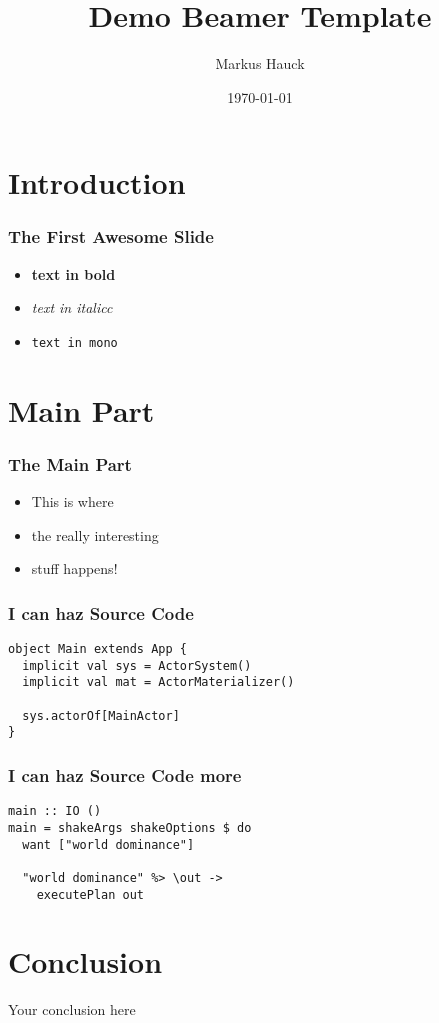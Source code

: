 \documentclass{beamer}
\title{Demo Beamer Template}
\author{Markus Hauck}
\date{\today}
\begin{document}
 
\frame{\titlepage}

\section{Introduction}
\label{sec:introduction}
 
\begin{frame}
\frametitle{The First Awesome Slide}
\begin{itemize}
\item \textbf{text in bold}
\item \textit{text in italicc}
\item \texttt{text in mono}
\end{itemize}
\end{frame}

\section{Main Part}
\label{sec:main-part}
\begin{frame}
  \frametitle{The Main Part}
  \begin{itemize}
  \item This is where
  \item the really interesting
  \item stuff happens!
  \end{itemize}
\end{frame}

\begin{frame}[fragile]
  \frametitle{I can haz Source Code}
  \begin{center}
\begin{verbatim}
object Main extends App {
  implicit val sys = ActorSystem()
  implicit val mat = ActorMaterializer()
  
  sys.actorOf[MainActor]
}
\end{verbatim}
  \end{center}
\end{frame}

\begin{frame}[fragile]
  \frametitle{I can haz Source Code more}
  \begin{center}
\begin{verbatim}
main :: IO ()
main = shakeArgs shakeOptions $ do
  want ["world dominance"]

  "world dominance" %> \out ->
    executePlan out
\end{verbatim}
  \end{center}
\end{frame}

\section{Conclusion}
\label{sec:conclusion}

\begin{frame}
  \begin{center}
    \huge
    Your conclusion here
  \end{center}
\end{frame}
 
\end{document}
